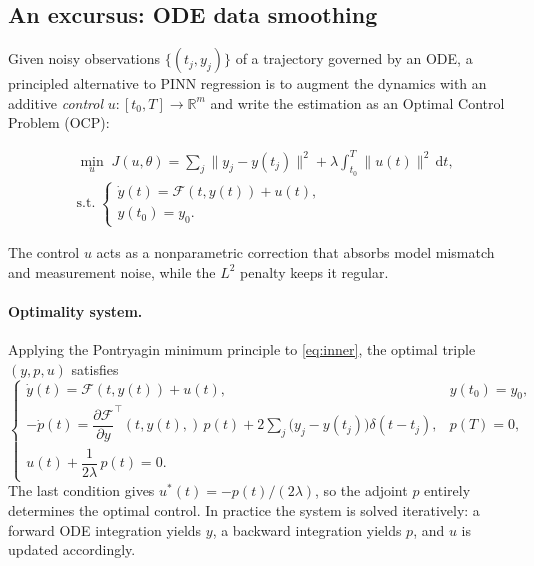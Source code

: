 \documentclass{article}
\begin{document}
\subsection{An excursus: ODE data smoothing}\label{sec:smoothing}

Given noisy observations $\{(t_j,y_j)\}$ of a trajectory governed by an ODE, a principled alternative to PINN regression
is to augment the dynamics with an additive \emph{control} $u:[t_0,T]\to
\mathbb{R}^m$ and write the estimation as an Optimal Control Problem (OCP):

\begin{equation}\label{eq:inner}
    \begin{aligned}
        &\min_{u}\;J(u,\theta)
        = \sum_{j}\bigl\|y_j - y(t_j)\bigr\|^2
        + \lambda\int_{t_0}^{T}\|u(t)\|^2\,\mathrm{d}t, \\
        &\text{s.t.}\;
        \begin{cases}
            \dot{y}(t) = \mathcal{F}(t,y(t))+u(t),\\
            y(t_0)=y_0.
        \end{cases}
    \end{aligned}
\end{equation}

The control $u$ acts as a nonparametric correction that absorbs model
mismatch and measurement noise, while the $L^2$ penalty keeps it regular.

\paragraph{Optimality system.}
Applying the Pontryagin minimum principle to \eqref{eq:inner}, the optimal
triple $(y,p,u)$ satisfies
\begin{equation}
    \begin{cases}
        \dot{y}(t)  = \mathcal{F}(t,y(t))+u(t), &y(t_0)=y_0,\\[4pt]
        -\dot{p}(t) = \dfrac{\partial \mathcal{F}}{\partial y}^{\!\top}(t,y(t),)\,p(t)
                      + 2\displaystyle\sum_{j}\bigl(y_j-y(t_j)\bigr)\delta(t-t_j), &p(T)=0,\\[4pt]
        u(t) + \dfrac{1}{2\lambda}\,p(t) = 0.
    \end{cases}
\end{equation}
The last condition gives $u^*(t)=-p(t)/(2\lambda)$, so the adjoint $p$ entirely determines the optimal control.  In practice the system is solved iteratively: a forward ODE integration yields $y$, a backward integration yields $p$, and $u$ is updated accordingly.
\end{document}
